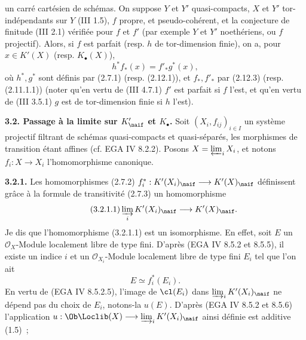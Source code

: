 un
carré cartésien de schémas. On suppose \(Y\) et \(Y'\) quasi-compacts, \(X\) et \(Y'\) tor-indépendants sur \(Y\) (III 1.5), \(f\) propre, et pseudo-cohérent, et la conjecture de finitude (III 2.1) vérifiée pour \(f\) et \(f'\) (par exemple \(Y\) et \(Y'\) noethériens, ou \(f\) projectif). Alors, si \(f\) est parfait (resp. \(h\) de tor-dimension finie), on a, pour \(x\in K'(X)\) (resp. \(K_{\bullet}(X)\)),
\[
 h^* f_*(x)=f'_* g^*(x),
\]
où \(h^*,g^*\) sont définis par (2.7.1) (resp. (2.12.1)), et \(f_*,f'_*\) par (2.12.3) (resp. (2.11.1.1)) (noter qu'en vertu de (III 4.7.1) \(f'\) est parfait si \(f\) l'est, et qu'en vertu de (III 3.5.1) \(g\) est de tor-dimension finie si \(h\) l'est).

\textbf{3.2. Passage à la limite sur \(K'_{\naif}\) et \(K_{\bullet}\).} Soit \((X_i,f_{ij})_{i\in I}\) un système projectif filtrant de schémas quasi-compacts et quasi-séparés, les morphismes de transition étant affines (cf. EGA IV 8.2.2). Posons \(X=\varprojlim_i X_i\), et notons \(f_i:X\to X_i\) l'homomorphisme canonique.

\textbf{3.2.1.} Les homomorphismes (2.7.2) \(f_i^*:K'(X_i)_{\naif}\longrightarrow K'(X)_{\naif}\) définissent grâce à la formule de transitivité (2.7.3) un homomorphisme
\begin{equation}\tag{3.2.1.1}
 \varinjlim_i K'(X_i)_{\naif}\longrightarrow K'(X)_{\naif}.
\end{equation}
Je dis que l'homomorphisme (3.2.1.1) est un isomorphisme. En effet, soit \(E\) un \(\mathcal O_X\)-Module localement libre de type fini. D'après (EGA IV 8.5.2 et 8.5.5), il existe un indice \(i\) et un \(\mathcal O_{X_i}\)-Module localement libre de type fini \(E_i\) tel que l'on ait
\[
 E\simeq f_i^*(E_i).
\]
En vertu de (EGA IV 8.5.2.5), l'image de \(\cl(E_i)\) dans \(\varinjlim_i K'(X_i)_{\naif}\) ne dépend pas du choix de \(E_i\), notons-la \(u(E)\). D'après (EGA IV 8.5.2 et 8.5.6) l'application
\(u:\Ob\Loclib(X)\longrightarrow \varinjlim_i K'(X_i)_{\naif}\) ainsi définie est additive (1.5)~;
